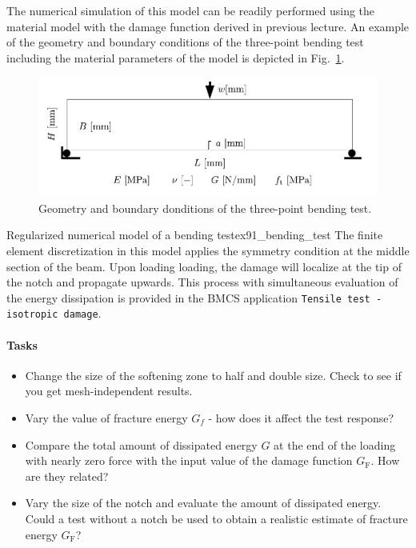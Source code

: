 \documentclass[main.tex]{subfiles}
\begin{document}
The numerical simulation of this model can be readily performed using the material model with the damage function 
derived in previous lecture. An example of the geometry and boundary conditions of the three-point bending test including the material parameters of the model is depicted in Fig.~\ref{FIGf_bending}.
\begin{figure}
\centering
\includegraphics[width=12cm]{fig/Lecture09/figure_bending}
\caption{Geometry and boundary donditions of the three-point bending test.}
\label{FIGf_bending}
\end{figure}

\begin{bmcsex}{Regularized numerical model of a bending test}{ex91_bending_test}
The finite element discretization in this model applies the symmetry condition at the middle section of the beam.  
Upon loading loading, the damage will localize at the tip of the notch and propagate upwards.
This process with simultaneous evaluation of the energy dissipation is provided in the BMCS application 
\texttt{Tensile test - isotropic damage}.

\paragraph{Tasks}
\begin{itemize}
\item Change the size of the softening zone to half and double size. Check to see if you get mesh-independent results.
\item Vary the value of fracture energy $G_f$ - how does it affect the test response?
\item Compare the total amount of dissipated energy $G$ at the end of the loading with nearly zero force with the input value of the damage function $G_\mathrm{F}$. How are they related?
\item Vary the size of the notch and evaluate the amount of dissipated energy. Could a test without a notch be used to obtain a realistic estimate of fracture energy $G_\mathrm{F}$?
\end{itemize}
\end{bmcsex}
\end{document}
